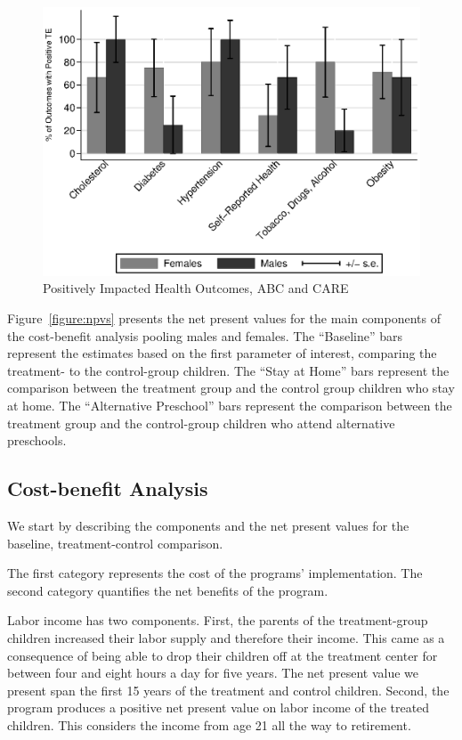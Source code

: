 \begin{figure}[H]
		\caption{Positively Impacted Health Outcomes, ABC and CARE} \label{fig:ppositivecategory2}
		\includegraphics[width=.78\columnwidth]{output/itt_noctrl_cats2.eps}
\end{figure}

Figure~\ref{figure:npvs} presents the net present values for the main components of the cost-benefit analysis pooling males and females. The ``Baseline'' bars represent the estimates based on the first parameter of interest, comparing the treatment- to the control-group children. The ``Stay at Home'' bars represent the comparison between the treatment group and the control group children who stay at home. The ``Alternative Preschool'' bars represent the comparison between the treatment group and the control-group children who attend alternative preschools.

\subsection{Cost-benefit Analysis} \label{section:cbaresults}

We start by describing the components and the net present values for the baseline, treatment-control comparison.

The first category represents the cost of the programs' implementation. The second category quantifies the net benefits of the program.

Labor income has two components. First, the parents of the treatment-group children increased their labor supply and therefore their income. This came as a consequence of being able to drop their children off at the treatment center for between four and eight hours a day for five years. The net present value we present span the first 15 years of the treatment and control children. Second, the program produces a positive net present value on labor income of the treated children. This considers the income from age 21 all the way to retirement.

